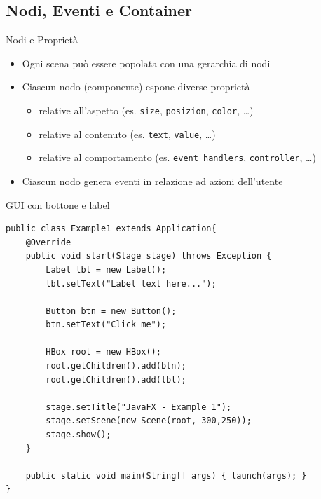 \documentclass[presentation]{beamer}
\begin{document}
\subsection{Nodi, Eventi e Container}

\begin{frame}{Nodi e Proprietà}
\begin{itemize}\itemsep10pt
\item Ogni scena può essere popolata con una gerarchia di nodi
\item Ciascun nodo (componente) espone diverse proprietà
\begin{itemize}
\item relative all'aspetto (es. \texttt{size}, \texttt{posizion}, \texttt{color}, \dots)
\item relative al contenuto (es. \texttt{text}, \texttt{value}, \dots)
\item relative al comportamento (es. \texttt{event handlers}, \texttt{controller}, \dots)
\end{itemize}
\item Ciascun nodo genera eventi in relazione ad azioni dell'utente
\end{itemize}
\end{frame}

\begin{frame}[fragile]{GUI con bottone e label}
\begin{lstlisting}
public class Example1 extends Application{
	@Override
	public void start(Stage stage) throws Exception {
		Label lbl = new Label();
		lbl.setText("Label text here...");
		
		Button btn = new Button();
		btn.setText("Click me");
		
		HBox root = new HBox();
		root.getChildren().add(btn);
		root.getChildren().add(lbl);
				
		stage.setTitle("JavaFX - Example 1");
		stage.setScene(new Scene(root, 300,250));
		stage.show();
	}
	
	public static void main(String[] args) { launch(args); }
}
\end{lstlisting}
\end{frame}
\end{document}
